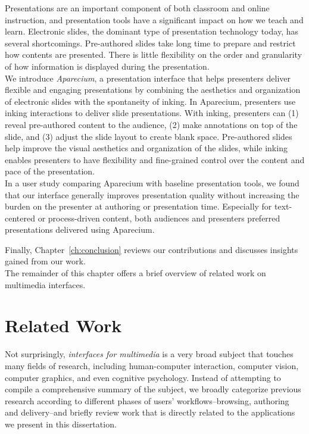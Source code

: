 \begin{mldescription}
%
Presentations are an important component of both classroom
and online instruction, and presentation tools have a significant impact on how we teach and learn. Electronic slides, the dominant type of presentation technology today, has several shortcomings. Pre-authored slides take long time to prepare and restrict how contents are presented. There is little flexibility on the order and granularity of how information is displayed during the presentation.\\
We introduce \emph{Aparecium}, a presentation interface that helps presenters deliver flexible and engaging presentations by combining
the aesthetics and organization of electronic slides with
the spontaneity of inking. In Aparecium, presenters use inking
interactions to deliver slide presentations. With inking, presenters
can (1) reveal pre-authored content to the audience,
(2) make annotations on top of the slide, and (3) adjust the
slide layout to create blank space. Pre-authored slides help improve
the visual aesthetics and organization of the slides, while
inking enables presenters to have flexibility and fine-grained
control over the content and pace of the presentation.\\
In a user study comparing Aparecium with baseline presentation
tools, we found that our interface generally improves presentation
quality without increasing the burden on the presenter
at authoring or presentation time. Especially for text-centered
or process-driven content, both audiences and presenters preferred
presentations delivered using Aparecium.

\end{mldescription}
Finally, Chapter~\ref{ch:conclusion} reviews our contributions and discusses insights gained from our work. \\
The remainder of this chapter offers a brief overview of related work on multimedia interfaces.  

\section{Related Work}
Not surprisingly, \emph{interfaces for multimedia} is a very broad subject that touches many fields of research, including human-computer interaction, computer vision, computer graphics, and even cognitive psychology. Instead of attempting to compile a comprehensive summary of the subject, we broadly categorize previous research according to different phases of users' workflows--browsing, authoring and delivery--and briefly review work that is directly related to the applications we present in this dissertation. 

